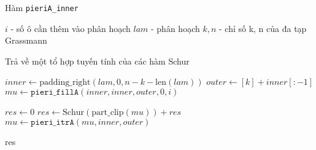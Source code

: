 \documentclass[11pt,a4paper]{book}
\begin{document}
\begin{algorithm}
	\caption{Hàm \texttt{pieriA\_inner}}
	\begin{algorithmic}[1] %
	
	\Require 
	\State $i$ - số ô cần thêm vào phân hoạch
	\State $lam$ - phân hoạch
	\State $k, n$ - chỉ số k, n của đa tạp Grassmann
	
	\Ensure Trả về một tổ hợp tuyến tính của các hàm Schur
	
	\State $inner \leftarrow \text{padding\_right}(lam, 0, n-k-\text{len}(lam))$ 
	\State $outer \leftarrow [k] + inner[:-1]$ 
	\State $mu \leftarrow \texttt{pieri\_fillA}(inner, inner, outer, 0, i)$ 
	
	\State $res \leftarrow 0$
	 
		\State $res \leftarrow \text{Schur}(\text{part\_clip}(mu)) + res$ 
		\State $mu \leftarrow \texttt{pieri\_itrA}(mu, inner, outer)$ 
	\EndWhile
	
	\State \Return res 
	
	\end{algorithmic}
\end{algorithm}
\end{document}
